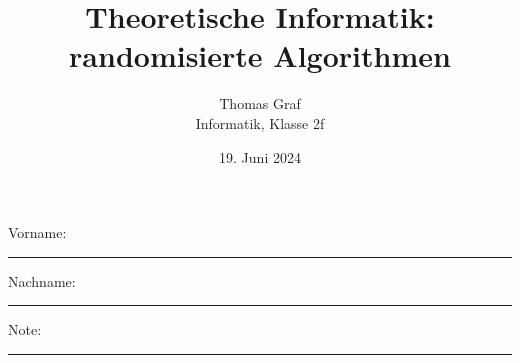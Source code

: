 \newtoggle{withbonus}  %
\lstset{style=Python}

\newcommand{\mycourse}{Informatik}
\newcommand{\myclass}{Klasse 2f}
\newcommand{\mydate}{19. Juni 2024}

\title{\textbf{Theoretische Informatik: randomisierte Algorithmen}}
\author{Thomas Graf\\
\mycourse, \myclass}
\date{\mydate}
\maketitle
\thispagestyle{headandfoot}		

\begin{center}
\end{center}
\vspace{10mm}

\begin{center}
	Vorname: \rule{45mm}{0.8pt}\qquad Nachname: \rule{45mm}{0.8pt}
\end{center}
\vspace{20mm}

\begin{center}
	\iftoggle{withbonus} {
		\combinedgradetable[h][questions]
	} {
		\gradetable[h][questions]
	}
\end{center}
\vspace{15mm}
\begin{center}
	Note: 
	\vspace{10mm}
	
	\rule{8mm}{1.2pt}
\end{center}
\clearpage


